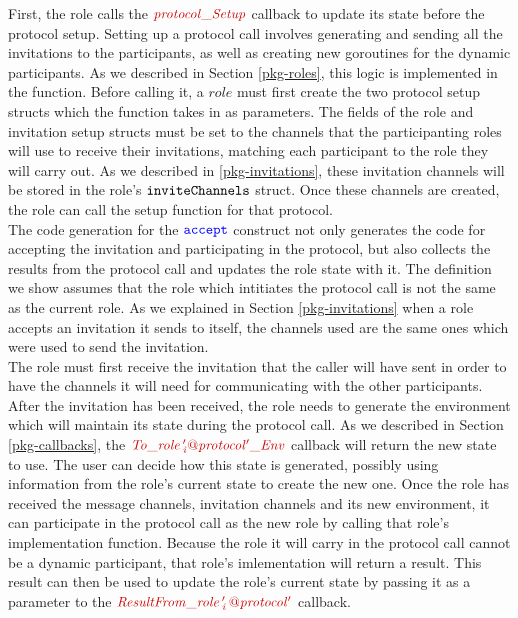 \documentclass[12pt,twoside]{report}
\begin{document}
First, the role calls the $\functionname{protocol\_Setup}$ callback to update its state before the protocol setup. Setting up a protocol call involves generating and sending all the invitations to the participants, as well as creating new goroutines for the dynamic participants. As we described in Section \ref{pkg-roles}, this logic is implemented in the {\color{dkred}\textit{}} function. Before calling it, a $\mathit{role}$ must first create the two protocol setup structs which the function takes in as parameters. The fields of the role and invitation setup structs must be set to the channels that the participanting roles will use to receive their invitations, matching each participant to the role they will carry out. As we described in \ref{pkg-invitations}, these invitation channels will be stored in the role's ${\mathtt{inviteChannels}}$ struct. Once these channels are created, the role can call the setup function for that protocol.\\

The code generation for the ${\color{blue}\mathtt{accept}}$ construct not only generates the code for accepting the invitation and participating in the protocol, but also collects the results from the protocol call and updates the role state with it. The definition we show assumes that the role which intitiates the protocol call is not the same as the current role. As we explained in Section \ref{pkg-invitations} when a role accepts an invitation it sends to itself, the channels used are the same ones which were used to send the invitation.\\

The role must first receive the invitation that the caller will have sent in order to have the channels it will need for communicating with the other participants. After the invitation has been received, the role needs to generate the environment which will maintain its state during the protocol call. As we described in Section \ref{pkg-callbacks}, the $\functionname{To\_role\,'_i@protocol'\_Env}$ callback will return the new state to use. The user can decide how this state is generated, possibly using information from the role's current state to create the new one. Once the role has received the message channels, invitation channels and its new environment, it can participate in the protocol call as the new role by calling that role's implementation function. Because the role it will carry in the protocol call cannot be a dynamic participant, that role's imlementation will return a result. This result can then be used to update the role's current state by passing it as a parameter to the $\functionname{ResultFrom\_role\,'_i\,@protocol'}$ callback.
\end{document}
